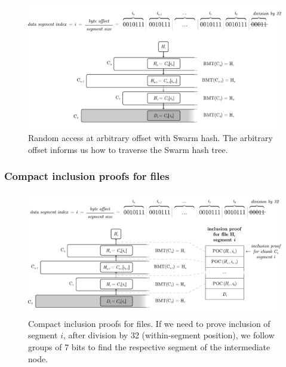 \begin{figure}[htbp]
\centering
\includegraphics[width=\textwidth]{fig/random-access.pdf}
\caption[Random access at arbitrary offset with Swarm hash \statusgreen]{Random access at arbitrary offset with Swarm hash. The arbitrary offset informs us how to traverse the Swarm hash tree.}
\label{fig:random-access}
\end{figure}

\subsubsection{Compact inclusion proofs for files}


\begin{figure}[htbp]
\centering
\includegraphics[width=\textwidth]{fig/file-inclusion.pdf}
\caption[Compact inclusion proofs for files \statusgreen]{Compact inclusion proofs for files. If we need to prove inclusion of segment   $i$, after division by 32 (within-segment position), we follow groups of 7 bits to find the respective segment of the intermediate node.}
\label{fig:file-inclusion}
\end{figure}


